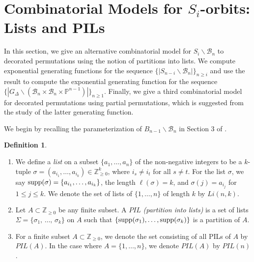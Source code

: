 \documentclass[12pt]{amsart}
\numberwithin{equation}{section}
\theoremstyle{remark}
\theoremstyle{definition}
\newtheorem{dfn}[thm]{Definition}
\newcommand{\supp}{{\rm supp}}
\newcommand{\B}{\mathcal{B}}
\newcommand{\Borbitspace}{B_{n-1}\backslash\B_{n}}
\begin{document}
\section{Combinatorial Models for $S_{i}$-orbits: Lists and PILs}\label{s:models}




In this section, we give an alternative combinatorial 
model for $S_{i}\backslash\B_{n}$ to decorated permutations using the notion of partitions into lists.   We compute exponential generating functions for 
the sequence $\{|S_{n-i}\backslash\B_{n}|\}_{n\geq i}$ and use the result to compute the exponential generating function for the sequence $\{|G_{\Delta}\backslash (\B_{n}\times\B_{n}\times\mathbb{P}^{n-1})|\}_{n\geq 1}$. Finally, we give a third combinatorial model for decorated permutations using partial permutations, which is suggested from the study of the latter generating function. 

  We begin by recalling the parameterization of $\Borbitspace$ in Section 3 of \cite{CE21II}. 

\begin{dfn}\label{dfn:lists}
\begin{enumerate}
\item We define a \emph{list} on a subset $\{a_{1},\dots, a_{n}\}$ of the non-negative integers to be a $k$-tuple $\sigma=(a_{i_{1}},\dots, a_{i_{k}}) \in \mathbb{Z}_{\geq 0}^k$, where $i_{s}\neq i_{t}$ for all $s\neq t$.  %
For the list $\sigma$, we say
$\supp(\sigma)=\{ a_{i_1}, \dots, a_{i_k} \}$, the length $\ell(\sigma)=k$,
and $\sigma(j)=a_{i_j}$ for $1 \le j \le k$.  We denote the set of lists of $\{1,\dots, n\}$ of length $k$ by $Li(n,k)$. 
\item  Let $A\subset \mathbb{Z}_{\geq 0}$ be any finite subset.  A $PIL$ \emph {(partition into lists)} is a set of lists 
$\Sigma=\{\sigma_{1},\, \dots, \, \sigma_{k}\}$ on $A$ such that $\{\supp(\sigma_{1}),\dots, \supp(\sigma_{k})\}$ is a partition of $A$. 
\item For a finite subset $A\subset\mathbb{Z}_{\geq 0}$, we denote the set consisting of all PILs of $A$ by $PIL(A)$.  
In the case where $A=\{1,\dots, n\}$, we denote $PIL(A)$ by $PIL(n)$. 
\end{enumerate}
\end{dfn}
\end{document}
